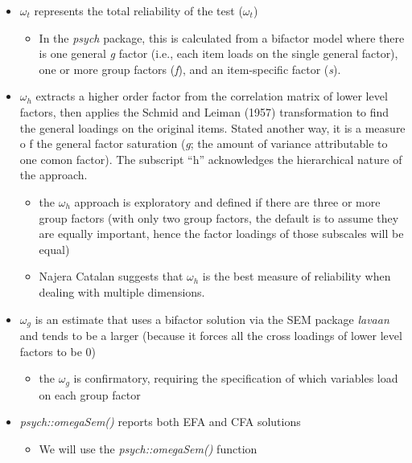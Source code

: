 \documentclass[
  english,
]{book}
\providecommand{\tightlist}{%
  \setlength{\itemsep}{0pt}\setlength{\parskip}{0pt}}
\begin{document}
\begin{itemize}
\tightlist
\item
  \(\omega_{t}\) represents the total reliability of the test (\(\omega_{t}\))

  \begin{itemize}
  \tightlist
  \item
    In the \emph{psych} package, this is calculated from a bifactor model where there is one general \emph{g} factor (i.e., each item loads on the single general factor), one or more group factors (\emph{f}), and an item-specific factor (\emph{s}).
  \end{itemize}
\item
  \(\omega_{h}\) extracts a higher order factor from the correlation matrix of lower level factors, then applies the Schmid and Leiman (1957) transformation to find the general loadings on the original items. Stated another way, it is a measure o f the general factor saturation (\emph{g}; the amount of variance attributable to one comon factor). The subscript ``h'' acknowledges the hierarchical nature of the approach.

  \begin{itemize}
  \tightlist
  \item
    the \(\omega_{h}\) approach is exploratory and defined if there are three or more group factors (with only two group factors, the default is to assume they are equally important, hence the factor loadings of those subscales will be equal)
  \item
    Najera Catalan \citep{najera_catalan_reliability_2019} suggests that \(\omega_{h}\) is the best measure of reliability when dealing with multiple dimensions.
  \end{itemize}
\item
  \(\omega_{g}\) is an estimate that uses a bifactor solution via the SEM package \emph{lavaan} and tends to be a larger (because it forces all the cross loadings of lower level factors to be 0)

  \begin{itemize}
  \tightlist
  \item
    the \(\omega_{g}\) is confirmatory, requiring the specification of which variables load on each group factor
  \end{itemize}
\item
  \emph{psych::omegaSem()} reports both EFA and CFA solutions

  \begin{itemize}
  \tightlist
  \item
    We will use the \emph{psych::omegaSem()} function
  \end{itemize}
\end{itemize}
\end{document}
